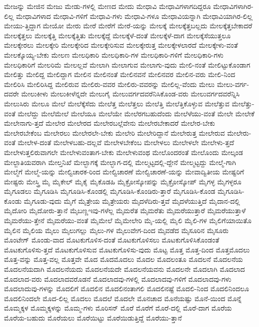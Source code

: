 {ಮೇಜನ್ನು
ಮೇಜಿನ
ಮೇಜು
ಮೇಡು-ಗಳಲ್ಲಿ
ಮೇಣದ
ಮೇದು
ಮೇಧಾವಿ
ಮೇಧಾವಿಗಳಾಗದಿದ್ದರೂ
ಮೇಧಾವಿಗಳಾಗಿರ-ಲಿಲ್ಲ
ಮೇಧಾವಿಗಳಾದ
ಮೇಧಾವಿ-ಗಳಿಗೆ
ಮೇಧಾವಿ-ಗಳು
ಮೇಧಾವಿ-ಗಳೂ
ಮೇಧಾವಿಯನ್ನಾಗಿ
ಮೇಧಾವಿಯಾಗಿರ-ಲಿಲ್ಲ
ಮೇಯು-ತ್ತಿದ್ದಾಗ
ಮೇಯೋ
ಮೇರು
ಮೇರೆ
ಮೇರೆಗೆ
ಮೇರೆ-ಯನ್ನು
ಮೇಲಕ್ಕೆ
ಮೇಲಕ್ಕೆತ್ತಬಲ್ಲದು
ಮೇಲಕ್ಕೆತ್ತಬೇಕಾದರೆ
ಮೇಲಕ್ಕೆತ್ತಲು
ಮೇಲಕ್ಕೆತ್ತಿ
ಮೇಲಕ್ಕೆತ್ತಿತು
ಮೇಲಕ್ಕೆದ್ದೆ
ಮೇಲಕ್ಕೆಳೆ-ದಂತೆ
ಮೇಲಕ್ಕೆಳೆ-ದಾಗ
ಮೇಲಕ್ಕೆಸೆಯುತ್ತಲೂ
ಮೇಲಕ್ಕೇರಲು
ಮೇಲಕ್ಕೇರಿ
ಮೇಲಕ್ಕೇರಿದ
ಮೇಲಕ್ಕೇರಿಸುವ
ಮೇಲಕ್ಕೇರುತ್ತ
ಮೇಲಕ್ಕೇಳಲಾರದೆ
ಮೇಲಕ್ಕೇಳು-ವಂತೆ
ಮೇಲಕ್ಕೊಯ್ಯ-ಬೇಕು
ಮೇಲಣ
ಮೇಲಧಿಕಾರಿ
ಮೇಲಧಿಕಾರಿ-ಗಳ
ಮೇಲಧಿಕಾರಿ-ಗಳಿಗೆ
ಮೇಲಧಿಕಾರಿ-ಗಳು
ಮೇಲಧಿಕಾರಿಗೆ
ಮೇಲರಿಮೆ
ಮೇಲಲ್ಲವೆ
ಮೇಲಾಗಿ
ಮೇಲಾಗುವ
ಮೇಲಾಗು-ವುದು
ಮೇಲಿ-ನಂತೆ
ಮೇಲಿಟ್ಟುಕೊಂಡಾಗ
ಮೇಲಿತ್ತು
ಮೇಲಿದ್ದ
ಮೇಲಿದ್ದಾಗ
ಮೇಲಿನ
ಮೇಲಿನಂತೆ
ಮೇಲಿನವನೆ
ಮೇಲಿನವರ
ಮೇಲಿನ-ವರು
ಮೇಲಿ-ನಿಂದ
ಮೇಲಿರಿಸಿ
ಮೇಲಿರಿಸಿದ್ದ
ಮೇಲಿರುವ
ಮೇಲಿರು-ವವರ
ಮೇಲಿರು-ವವರನ್ನು
ಮೇಲಿಲ್ಲ-ವೆಂದು
ಮೇಲು
ಮೇಲು-ವರ್ಗ-ದವರೇ
ಮೇಲುಕೀಳು
ಮೇಲುಕೀಳೆನ್ನದೇ
ಮೇಲುಗೈ
ಮೇಲುವರ್ಗದವರೆನಿಸಿಕೊಂಡ-ವರು
ಮೇಲುವರ್ಗದವರೆನ್ನಿಸಿ
ಮೇಲುಸಿರು
ಮೇಲೂ
ಮೇಲೆ
ಮೇಲೆಕ್ಕೆಸೆದು
ಮೇಲೆತ್ತ
ಮೇಲೆತ್ತಲು
ಮೇಲೆತ್ತಿ
ಮೇಲೆತ್ತಿಕೊಳ್ಳುವ
ಮೇಲೆತ್ತುವ
ಮೇಲೆತ್ತು-ವಂತೆ
ಮೇಲೆದ್ದು
ಮೇಲೆಮೇಲೆ
ಮೇಲೆಯೂ
ಮೇಲೆಯೇ
ಮೇಲೆರಗಬಹುದೆಂದು
ಮೇಲೆಳೆಯು-ವಂತೆ
ಮೇಲೇ
ಮೇಲೇಕೆ
ಮೇಲೇನಾಗು-ತ್ತದೆ
ಮೇಲೇರ
ಮೇಲೇರದ
ಮೇಲೇರಬಲ್ಲೆವೇನು
ಮೇಲೇರಬೇಕಾದರೆ
ಮೇಲೇರ-ಬೇಕು
ಮೇಲೇರಬೇಕೆಂಬ
ಮೇಲೇರಲು
ಮೇಲೇರಲೇ-ಬೇಕು
ಮೇಲೇರಿ
ಮೇಲೇರಿದ್ದಾನೆ
ಮೇಲೇರುತ್ತ
ಮೇಲೇರುವ
ಮೇಲೇರು-ವಂತೆ
ಮೇಲೇಳ-ದಂತೆ
ಮೇಲೇಳಬಹು-ದಲ್ಲವೆ
ಮೇಲೇಳಬೇಕೆಂಬ
ಮೇಲೇಳಲು
ಮೇಲೇಳಲೇ
ಮೇಲೇಳು-ತ್ತದೆ
ಮೇಲೇಳುತ್ತಲಿರುವಾಗಲೇ
ಮೇಲೇಳುವಂತಾಗ-ಬೇಕು
ಮೇಲೇಳುವಂಥ
ಮೇಲೊಂದರಂತೆ
ಮೇಲೊಂದು
ಮೇಲ್ಕಂಡ
ಮೇಲ್ಜಾತಿಯವರಾಗಿ
ಮೇಲ್ತನಿಖೆ
ಮೇಲ್ಭಾಗಕ್ಕೆ
ಮೇಲ್ಭಾಗ-ದಲ್ಲಿ
ಮೇಲ್ಮಟ್ಟದಲ್ಲಿ-ದ್ದೇನೆ
ಮೇಲ್ಮಟ್ಟದ್ದು
ಮೇಲ್ಮೆ-ಗಾಗಿ
ಮೇಲ್ಮೆಗೆ
ಮೇಲ್ಮೆ-ಯನ್ನು
ಮೇಲ್ವಿಚಾರಕ-ರಿಂದ
ಮೇಲ್ವಿಚಾರಣೆ
ಮೇಲ್ವಿಚಾರಣೆ-ಯನ್ನು
ಮೇವಾದ್ವಿತೀಯ
ಮೇಷ್ಟರಿಗೆ
ಮೇಷ್ಟರು
ಮೇಸ್ತ್ರಿ
ಮೈ
ಮೈಕೇಲ್
ಮೈಕೈ
ಮೈಕೊಡಹಿ
ಮೈಕ್ರೋಸ್ಕೋಪನ್ನು
ಮೈಕ್ರೋಸ್ಕೋಪ್
ಮೈಗಳ್ಳ
ಮೈಗಳ್ಳರೂ
ಮೈಗೂಡಲು
ಮೈಗೂಡಿಸಿ
ಮೈಗೂಡಿಸಿ-ಕೊಂಡಲ್ಲಿ
ಮೈಗೂಡಿಸಿ-ಕೊಂಡಿರು-ತ್ತಾರೆ
ಮೈಗೂಡಿಸಿ-ಕೊಂಡ
ಮೈಗೂಡಿಸಿ-ಕೊಂಡು
ಮೈಗೂಡು-ವುದು
ಮೈಗೆ
ಮೈತ್ರೇಯ
ಮೈತ್ರೇಯರು
ಮೈದಳೆದಿರು-ತ್ತವೆ
ಮೈದಳೆಯುತ್ತಿದೆ
ಮೈದಾನ-ದಲ್ಲಿ
ಮೈದೋರಿ
ಮೈದೋರು-ತ್ತಾನೆ
ಮೈಬಣ್ಣಇವು-ಗಳೆಲ್ಲ
ಮೈಮರೆತ
ಮೈಮರೆತು
ಮೈಮರೆಯುತ್ತಾರೆ
ಮೈಮರೆಯುತ್ತಾಳೆ
ಮೈಮರೆಯು-ತ್ತೇನೆ
ಮೈಮರೆಯು-ವಂತೆ
ಮೈಮೇಲೆ
ಮೈಮೇಲೇರಿ
ಮೈ-ಯಲ್ಲಿ
ಮೈಲಿ
ಮೈಲಿ-ಗಳ
ಮೈಲಿಗೆಯಾಯಿತೊ
ಮೈಲಿನ
ಮೈಲಿಯ
ಮೈಲು
ಮೈಲುಗಲ್ಲು
ಮೈಲು-ಗಳ
ಮೈಲುವೇಗ-ದಿಂದ
ಮೈವಡೆದ
ಮೈಸೂರಿನ
ಮೈಸೂರು
ಮೊಂಟೇಗ್
ಮೊಂಡು-ವಾದ
ಮೊಟಕುಗೊಳಿಸ-ದಂತೆ
ಮೊಟಕುಗೊಳಿಸಲು
ಮೊಟಕುಗೊಳಿಸಿಕೊಂಡಂತೆ
ಮೊಟಕುಗೊಳಿಸು-ತ್ತದೆ
ಮೊಟಕುಗೊಳಿಸುವ
ಮೊಟಕುಗೊಳಿಸು-ವುದು
ಮೊಟ್ಟ
ಮೊತ್ತ
ಮೊತ್ತ-ದಿಂದ
ಮೊತ್ತಮೊದಲು
ಮೊತ್ತ-ವನ್ನು
ಮೊತ್ತ-ವಲ್ಲ
ಮೊತ್ತವೇ
ಮೊದ
ಮೊದಮೊದಲು
ಮೊದಲ
ಮೊದಲಂತೂ
ಮೊದಲನೆ
ಮೊದಲನೆಯ
ಮೊದಲನೆಯದಾಗಿ
ಮೊದಲನೆಯದು
ಮೊದಲನೆಯದೇ
ಮೊದಲನೆಯವನು
ಮೊದಲನೇ
ಮೊದಲಾಗಿ
ಮೊದಲಾದ
ಮೊದಲಾದ-ವರು
ಮೊದಲಾದವರೊಡನೆ
ಮೊದಲಾದವು-ಗಳಲ್ಲಿ
ಮೊದಲಾದವು-ಗಳಿಗೆ
ಮೊದಲಾದವು-ಗಳು
ಮೊದಲಾದುವು-ಗಳನ್ನು
ಮೊದಲಿಗೆ
ಮೊದಲಿನ
ಮೊದಲಿನಂತಾಗಲಿ
ಮೊದಲಿನಷ್ಟೆ
ಮೊದಲಿ-ನಿಂದ
ಮೊದಲಿನಿಂದಲೂ
ಮೊದಲಿನಿಂದಲೇ
ಮೊದ-ಲಿಲ್ಲ
ಮೊದಲು
ಮೊದಲೆ
ಮೊದಲೇ
ಮೊನಚಾದ
ಮೊನೆಯಷ್ಟು
ಮೊನೆ-ಯಿಂದ
ಮೊನ್ನೆ
ಮೊಮ್ಮಕ್ಕಳ
ಮೊಮ್ಮಕ್ಕಳನ್ನು
ಮೊಮ್ಮ-ಗಳು
ಮೊರಿಸನ್
ಮೊರೆ
ಮೊರೆಗೆ
ಮೊರೆ-ದಲ್ಲಿ
ಮೊರೆ-ದಾಗ
ಮೊರೆಯ
ಮೊರೆಯ-ಬಹುದು
ಮೊರೆಯಲು
ಮೊರೆಯಿಟ್ಟು
ಮೊರೆಯಿಡುತ್ತಿದ್ದೆ
ಮೊರೆಯು-ತ್ತಾನೆ
}
